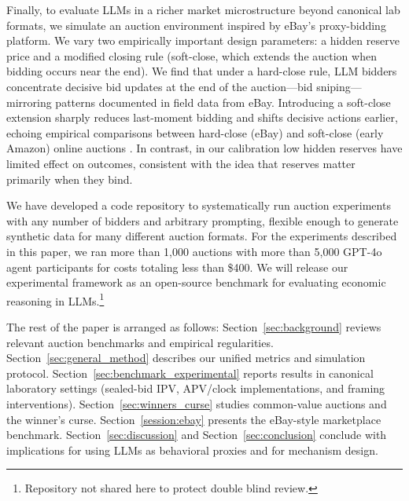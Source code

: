 Finally, to evaluate LLMs in a richer market microstructure beyond canonical lab formats, we simulate an auction environment inspired by eBay’s proxy-bidding platform. We vary two empirically important design parameters: a hidden reserve price and a modified closing rule (soft-close, which extends the auction when bidding occurs near the end). We find that under a hard-close rule, LLM bidders concentrate decisive bid updates at the end of the auction---bid sniping---mirroring patterns documented in field data from eBay. Introducing a soft-close extension sharply reduces last-moment bidding and shifts decisive actions earlier, echoing empirical comparisons between hard-close (eBay) and soft-close (early Amazon) online auctions \citep{roth2002last}. In contrast, in our calibration low hidden reserves have limited effect on outcomes, consistent with the idea that reserves matter primarily when they bind.



We have developed a code repository to systematically run auction experiments with any number of bidders and arbitrary prompting, flexible enough to generate synthetic data for many different auction formats. For the experiments described in this paper, we ran more than 1,000 auctions with more than 5,000 GPT-4o agent participants for costs totaling less than \$400. We will release our experimental framework as an open-source benchmark for evaluating economic reasoning in  LLMs.\footnote{Repository not shared here to protect double blind review.}

The rest of the paper is arranged as follows:
Section~\ref{sec:background} reviews relevant auction benchmarks and empirical regularities. Section~\ref{sec:general_method} describes our unified metrics and simulation protocol. Section~\ref{sec:benchmark_experimental} reports results in canonical laboratory settings (sealed-bid IPV, APV/clock implementations, and framing interventions). Section~\ref{sec:winners_curse} studies common-value auctions and the winner’s curse. Section~\ref{session:ebay} presents the eBay-style marketplace benchmark. Section~\ref{sec:discussion} and  Section~\ref{sec:conclusion} conclude with implications for using LLMs as behavioral proxies and for mechanism design.